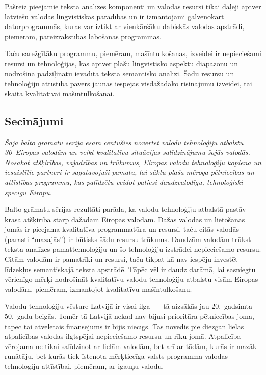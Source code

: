 \begin{multicols}{2}
Pašreiz pieejamie teksta analīzes komponenti un valodas resursi tikai daļēji aptver latviešu valodas lingvistiskās parādības un ir izmantojami galvenokārt datorprogrammās, kuras var iztikt ar vienkāršāku dabiskās valodas apstrādi, piemēram, pareizrakstības labošanas programmās.

Taču sarežģītāku programmu, piemēram, mašīntulkošanas, izveidei ir nepieciešami resursi un tehnoloģijas, kas aptver plašu lingvistisko aspektu diapazonu un nodrošina padziļinātu ievadītā teksta semantisko analīzi.
Šādu resursu un tehnoloģiju attīstība pavērs jaunas iespējas visdažādāko risinājumu izveidei, tai skaitā kvalitatīvai mašīntulkošanai.

\subsection{Secinājumi}

\emph{Šajā balto grāmatu sērijā esam centušies novērtēt valodu tehnoloģiju atbalstu 30~Eiropas valodām un veikt kvalitatīvu situācijas salīdzinājumu šajās valodās.
Nosakot atšķirības, vajadzības un trūkumus, Eiropas valodu tehnoloģiju kopiena un iesaistītie partneri ir sagatavojuši pamatu, lai sāktu plaša mēroga pētniecības un attīstības programmu, kas palīdzētu veidot patiesi daudzvalodīgu, tehnoloģiski spēcīgu Eiropu.}

Balto grāmatu sērijas rezultāti parāda, ka valodu tehnoloģiju atbalstā pastāv krasa atšķirība starp dažādām Eiropas valodām.
Dažās valodās un lietošanas jomās ir pieejama kvalitatīva programmatūra un resursi, taču citās valodās (parasti ``mazajās'') ir būtisks šādu resursu trūkums.
Daudzām valodām trūkst teksta analīzes pamattehnoloģiju un šo tehnoloģiju izstrādei nepieciešamo resursu.
Citām valodām ir pamatrīki un resursi, taču tikpat kā nav iespēju investēt līdzekļus semantiskajā teksta apstrādē.
Tāpēc vēl ir daudz darāmā, lai sasniegtu vērienīgo mērķi nodrošināt kvalitatīvu valodu tehnoloģiju atbalstu visām Eiropas valodām, piemēram, izmantojot kvalitatīvu mašīntulkošanu.

Valodu tehnoloģiju vēsture Latvijā ir visai ilga~--- tā aizsākās jau 20.~gadsimta 50.~gadu beigās.
Tomēr tā Latvijā nekad nav bijusi prioritāra pētniecības joma, tāpēc tai atvēlētais finansējums ir bijis niecīgs.
Tas novedis pie diezgan lielas atpalicības valodas ilgtspējai nepieciešamo resursu un rīku jomā. 
Atpalicība vērojama ne tikai salīdzinot ar lielām valodām, bet arī ar tādām, kurās ir mazāk runātāju, bet kurās tiek īstenota mērķtiecīga valsts programma valodas tehnoloģiju attīstībai, piemēram, ar igauņu valodu.


\end{multicols}
